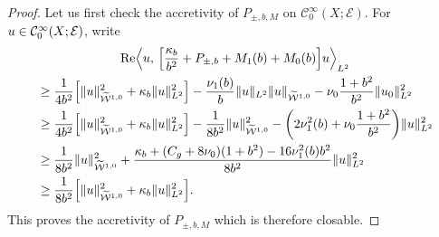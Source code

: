 \documentclass[AHL,Unicode,longabstracts]{cedram}
\newcommand{\clW}{\mathcal{W}}
\newcommand{\clC}{\mathcal{C}}
\newcommand{\clE}{\mathcal{E}}
\DeclareMathOperator{\Ree}{Re}
\let\originalleft\left
\let\originalright\right
\renewcommand{\left}{\mathopen{}\mathclose\bgroup\originalleft}
\renewcommand{\right}{\aftergroup\egroup\originalright}
\begin{document}
\begin{proof}
Let us first check the accretivity of $P_{\pm,b,M}$ on $\clC^{\infty}_{0}(X;\clE)$. For $u\in\linebreak \clC^{\infty}_{0}(X;\clE)$, write
\begin{multline*}
\Ree\left\langle u,\, \left[\frac{\kappa_{b}}{b^{2}}+P_{\pm,b}+M_{1}(b)+M_{0}(b)\right]u\right\rangle_{L^{2}}\\
\begin{aligned}
&\geq \frac{1}{4b^{2}}\left[\|u\|_{\widetilde{\clW}^{1,0}}^{2}+\kappa_{b}\|u\|_{L^{2}}^{2}\right] -\frac{\nu_{1}(b)}{b}\|u\|_{L^{2}}\|u\|_{\widetilde{\clW}^{1,0}} -\nu_{0}\frac{1+b^{2}}{b^{2}}\|u_{0}\|_{L^{2}}^{2}
\\
&\geq \frac{1}{4b^{2}}\left[\|u\|_{\widetilde{\clW}^{1,0}}^{2}+\kappa_{b}\|u\|_{L^{2}}^{2}\right] -\frac{1}{8b^{2}}\|u\|^{2}_{\widetilde{\clW}^{1,0}} -\left(2\nu_{1}^{2}(b)+\nu_{0}\frac{1+b^{2}}{b^{2}}\right)\|u\|_{L^{2}}^{2}
\\
&\geq \frac{1}{8b^{2}}\|u\|_{\widetilde{\clW}^{1,0}}^{2} +\frac{\kappa_{b}+(C_{g}+8\nu_{0})(1+b^{2})-16\nu_{1}^{2}(b)b^{2}}{8b^{2}}\|u\|_{L^{2}}^{2}\\ 
&\geq \frac{1}{8b^{2}}\left[\|u\|_{\widetilde{\clW}^{1,0}}^{2}+\kappa_{b}\|u\|_{L^{2}}^{2}\right].
\end{aligned}
\end{multline*}
This proves the accretivity of $P_{\pm,b,M}$ which is therefore closable.


\end{proof}
\end{document}
